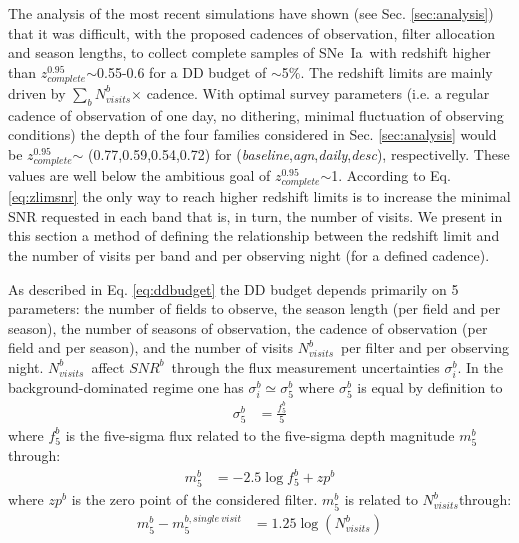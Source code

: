 \documentclass[skiphelvet,twocolumn]{aastex63}
\newcommand{\snrb}{\mbox{$SNR^b$}}
\newcommand{\sne}{{SNe~Ia}}
\newcommand{\zcompb}{\mbox{$z_{complete}^{0.95}$}}
\newcommand{\per}{$\%$}
\newcommand{\seq}{$\sim$}
\newcommand{\nvisitsb}{\mbox{$N_{visits}^b$}}
\newcommand{\sumnvisitsb}{\mbox{$\sum\limits_{b}N_{visits}^b$}}
\newcommand{\osfamily}[1]{{\it #1}}
\begin{document}
The analysis of the most recent simulations have shown (see Sec. \ref{sec:analysis}) that it was difficult, with the proposed cadences of observation, filter allocation and season lengths, to collect complete samples of \sne~with redshift higher than \zcompb\seq 0.55-0.6 for a DD budget of \seq 5\per.  %
The redshift limits are mainly driven by \sumnvisitsb$\times$ cadence. With optimal survey parameters (i.e. a regular cadence of observation of one day, no dithering, minimal fluctuation of observing conditions) the depth of the four families considered in Sec. \ref{sec:analysis} would be \zcompb $\sim$ (0.77,0.59,0.54,0.72) for (\osfamily{baseline},\osfamily{agn},\osfamily{daily},\osfamily{desc}), respectivelly. These values are well below the ambitious goal of \zcompb\seq1. According to Eq. \ref{eq:zlimsnr} the only way to reach higher redshift limits is to increase the minimal SNR requested in each band that is, in turn, the number of visits. We present in this section a method of defining the relationship between the redshift limit and the number of visits per band and per observing night (for a defined cadence). 
\par
As described in Eq. \ref{eq:ddbudget} the DD budget depends primarily on 5 parameters: the number of fields to observe, the season length (per field and per season), the number of seasons of observation, the cadence of observation (per field and per season), and the number of visits \nvisitsb~per filter and per observing night. \nvisitsb~affect \snrb~through the flux measurement uncertainties  $\sigma_i^b$. In the background-dominated regime one has $\sigma_i^b \simeq \sigma_5^b$ where $\sigma_5^b$ is equal by definition to
\begin{equation}
  \begin{aligned}
    \sigma_5^b &=  \frac{f_5^b}{5}
    \end{aligned}
\end{equation}
where $f_ 5^b$ is the five-sigma flux related to the five-sigma depth magnitude $m_5^b$ through:
\begin{equation}
  \begin{aligned}
    m_5^b &= -2.5 \log f_5^b+zp^b
    \end{aligned}
\end{equation}
where $zp^b$ is the zero point of the considered filter.  $m_5^b$ is related to \nvisitsb through:
\begin{equation}
  \begin{aligned}
    m_5^b - m_5^{b, single~visit} & =  1.25 \log(N_{visits}^b)
    \end{aligned}
  \label{eq:opt4}
\end{equation}
\end{document}
